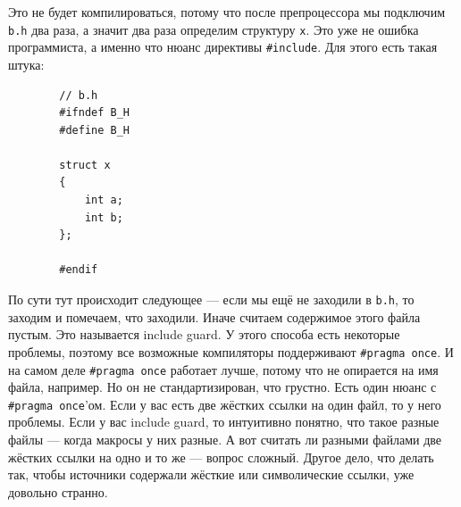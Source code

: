 \documentclass{article}
\begin{document}
    Это не будет компилироваться, потому что после препроцессора мы подключим \texttt{b.h} два раза, а значит два раза определим структуру \texttt{x}. Это уже не ошибка программиста, а именно что нюанс директивы \texttt{#include}. Для этого есть такая штука:
    \begin{verbatim}
        // b.h
        #ifndef B_H
        #define B_H

        struct x
        {
            int a;
            int b;
        };

        #endif
    \end{verbatim}
    По сути тут происходит следующее --- если мы ещё не заходили в \texttt{b.h}, то заходим и помечаем, что заходили. Иначе считаем содержимое этого файла пустым. Это называется include guard. У этого способа есть некоторые проблемы, поэтому все возможные компиляторы поддерживают \texttt{#pragma once}. И на самом деле \texttt{#pragma once} работает лучше, потому что не опирается на имя файла, например. Но он не стандартизирован, что грустно. Есть один нюанс с \texttt{#pragma once}'ом. Если у вас есть две жёстких ссылки на один файл, то у него проблемы. Если у вас include guard, то интуитивно понятно, что такое разные файлы --- когда макросы у них разные. А вот считать ли разными файлами две жёстких ссылки на одно и то же --- вопрос сложный. Другое дело, что делать так, чтобы источники содержали жёсткие или символические ссылки, уже довольно странно.
\end{document}
